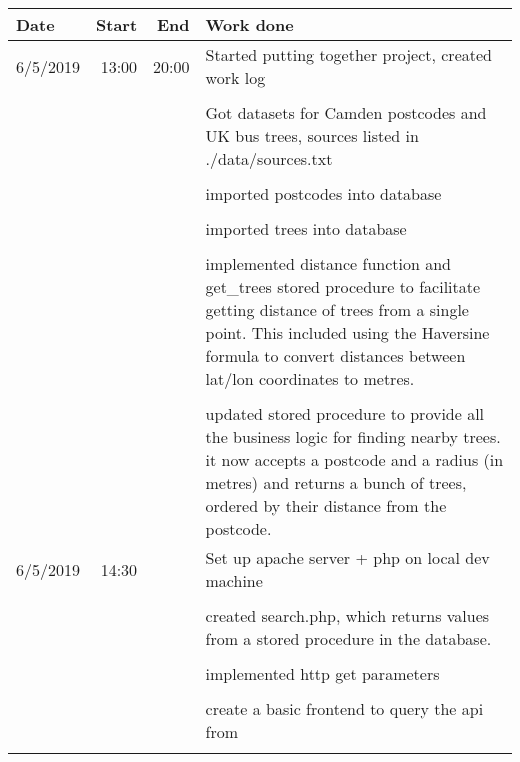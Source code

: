\documentclass{article}
\begin{document}
\begin{table}[h!]
    \begin{tabular}{l|r|r|p{15cm}}  %
        \textbf{Date} & \textbf{Start} & \textbf{End} & \textbf{Work done} \\
        \hline
        6/5/2019    &   13:00   &   20:00   &   Started putting together project, created work log\\
        &   &   &   \\
        &   &                               &   Got datasets for Camden postcodes and UK bus trees, sources listed in ./data/sources.txt \\
        &   &   &   \\
        &   &                               &   imported postcodes into database \\
        &   &   &   \\
        &   &                               &   imported trees into database \\
        &   &   &   \\
        &   &                               &   implemented distance function and get\_trees stored procedure to facilitate getting distance of trees from a single point. This included using the Haversine formula to convert distances between lat/lon coordinates to metres.  \\
        &   &   &   \\
        &   &                               &   updated stored procedure to provide all the business logic for finding nearby trees. it now accepts a postcode and a radius (in metres) and returns a bunch of trees, ordered by their distance from the postcode. \\
        \hline
        6/5/2019    &   14:30   &           &   Set up apache server + php on local dev machine\\
        &   &   &   \\
        &   &                               &   created search.php, which returns values from a stored procedure in the database.\\
        &   &   &   \\
        &   &                               &   implemented http get parameters\\
        &   &   &   \\
        &   &                               &   create a basic frontend to query the api from\\

        \hline
        &   &   &   \\
    \end{tabular}
\end{table}
\end{document}
